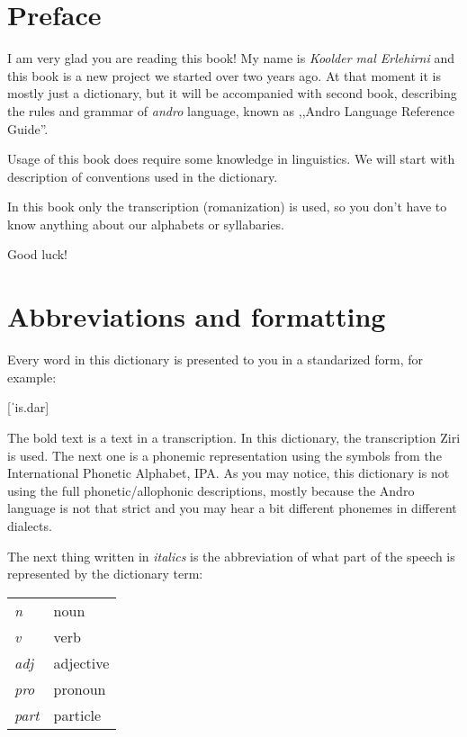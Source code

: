 \newpage

\section{Preface}

\begin{spacing}{1.1}

I am very glad you are reading this book! My name is \emph{Koolder mal
Erlehirni} and this book is a new project we started over two years ago. At that
moment it is mostly just a dictionary, but it will be accompanied with second
book, describing the rules and grammar of \emph{andro} language, known as
,,Andro Language Reference Guide''.

Usage of this book does require some knowledge in linguistics. We will start
with description of conventions used in the dictionary.

In this book only the transcription (romanization) is used, so you don't have to
know anything about our alphabets or syllabaries.

\bigskip

Good luck!

\section[Abbreviations and format]{Abbreviations and formatting}

Every word in this dictionary is presented to you in a standarized form, for
example:

[ˈis.dar]

The bold text is a text in a transcription. In this dictionary, the
transcription Ziri is used. The next one is a phonemic representation using the
symbols from the International Phonetic Alphabet, IPA. As you may notice, this
dictionary is not using the full phonetic/allophonic descriptions, mostly
because the Andro language is not that strict and you may hear a bit different
phonemes in different dialects.

The next thing written in \emph{italics} is the abbreviation of what part of the
speech is represented by the dictionary term:

\begin{table}[h]
\begin{tabular}{ll}
\emph{n}    & noun           \\
\emph{v}    & verb            \\
\emph{adj}  & adjective          \\
\emph{pro}  & pronoun \\
\emph{part} & particle
\end{tabular}
\end{table}


\end{spacing}
